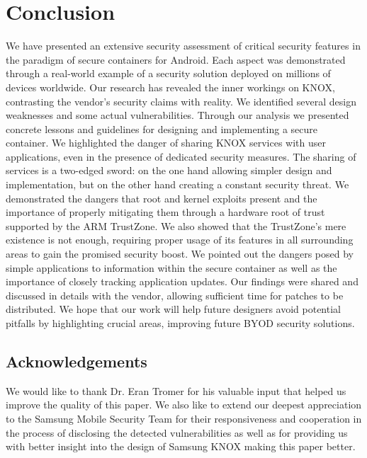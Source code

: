 \documentclass[11pt]{article}
\begin{document}
\section{Conclusion} \label{conclusion} 
We have presented an extensive security assessment of critical security features in the paradigm of secure containers for Android.
Each aspect was demonstrated through a real-world example of a security solution deployed on millions of devices worldwide.
Our research has revealed the inner workings on KNOX, contrasting the vendor's security claims with reality. We identified several design weaknesses 
and some actual vulnerabilities.
Through our analysis we presented concrete lessons and guidelines for designing and implementing a secure container.
We highlighted the danger of sharing KNOX services with user applications, even in the presence of dedicated security measures. 
The sharing of services is a two-edged sword: on the one hand allowing simpler design and implementation, but on the other hand creating a constant 
security threat. 
We demonstrated the dangers that root and kernel exploits present and the importance of properly mitigating them through a hardware root of 
trust supported by the ARM TrustZone.
We also showed that the TrustZone's mere existence is not enough, requiring proper usage of its features in all surrounding areas to gain the promised security boost.
We pointed out the dangers posed by simple applications to information within the secure container as well as the importance of 
closely tracking application updates.
Our findings were shared and discussed in details with the vendor, allowing sufficient time for patches to be distributed.
We hope that our work will help future designers avoid potential pitfalls by highlighting crucial areas, improving future BYOD security solutions.
 
\subsection*{Acknowledgements}
We would like to thank Dr. Eran Tromer for his valuable input that helped us improve the quality of this paper.
We also like to extend our deepest appreciation to the Samsung Mobile Security Team for their responsiveness and cooperation in the process
of disclosing the detected vulnerabilities as well as for providing us with better insight into the design of Samsung KNOX making this paper better.

{
\footnotesize 

\sloppy

}
\end{document}
